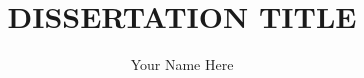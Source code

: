 \documentclass[12pt,oneside,final]{thesis}
\theoremstyle{definition}
\theoremstyle{remark}
\theoremstyle{remark}
\begin{document}
\title{DISSERTATION TITLE}
\author{Your Name Here}
\dissertation
\doctorphilosophy
\copyrightnotice






\appendix








\end{document}
